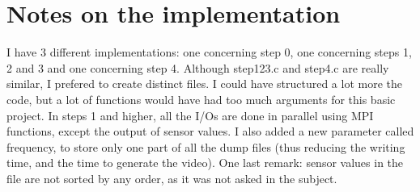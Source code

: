 \documentclass[a4paper,12pt]{article}
\begin{document}
\section{Notes on the implementation}

I have 3 different implementations: one concerning step 0, one concerning steps 1, 2 and 3 and one concerning step 4. Although step123.c and step4.c are really similar, I prefered to create distinct files. I could have structured a lot more the code, but a lot of functions would have had too much arguments for this basic project. In steps 1 and higher, all the I/Os are done in parallel using MPI functions, except the output of sensor values. I also added a new parameter called frequency, to store only one part of all the dump files (thus reducing the writing time, and the time to generate the video). One last remark: sensor values in the file are not sorted by any order, as it was not asked in the subject.
\end{document}
